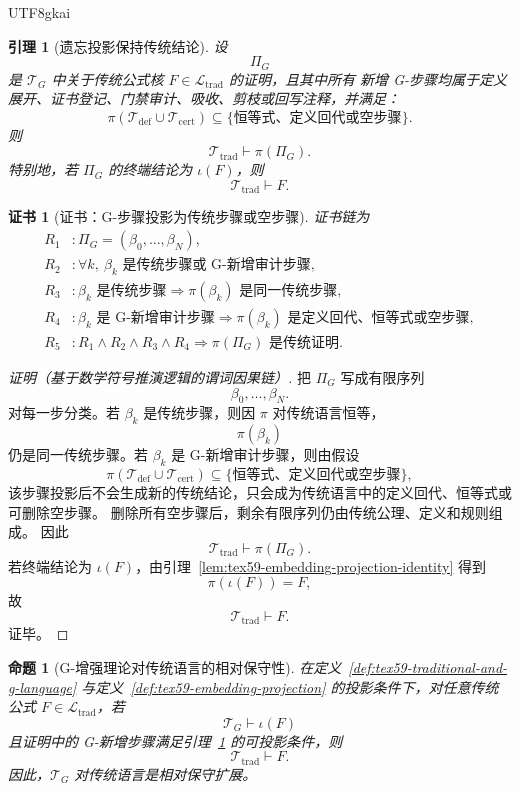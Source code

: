 \documentclass[12pt]{article}
\newtheorem{proposition}{命题}[section]
\newtheorem{lemma}{引理}[section]
\newtheorem{Certificate}{证书}[section]
\begin{document}
\begin{CJK*}{UTF8}{gkai}
\begin{lemma}[遗忘投影保持传统结论]
\label{lem:tex59-forgetful-projection-proof}
设
\[
  \Pi_G
\]
是 \(\mathcal T_G\) 中关于传统公式核 \(F\in\mathcal L_{\mathrm{trad}}\) 的证明，且其中所有
新增 G-步骤均属于定义展开、证书登记、门禁审计、吸收、剪枝或回写注释，并满足：
\[
  \pi(\mathcal T_{\mathrm{def}}\cup\mathcal T_{\mathrm{cert}})
  \subseteq
  \{\text{恒等式、定义回代或空步骤}\}.
\]
则
\[
  \mathcal T_{\mathrm{trad}}\vdash \pi(\Pi_G).
\]
特别地，若 \(\Pi_G\) 的终端结论为 \(\iota(F)\)，则
\[
  \mathcal T_{\mathrm{trad}}\vdash F.
\]
\end{lemma}

\begin{Certificate}[证书：G-步骤投影为传统步骤或空步骤]
\label{cert:tex59-forgetful-projection-proof}
证书链为
\[
\begin{aligned}
  R_1 &: \Pi_G=(\beta_0,\ldots,\beta_N),\\
  R_2 &: \forall k,\ \beta_k\text{ 是传统步骤或 G-新增审计步骤},\\
  R_3 &: \beta_k\text{ 是传统步骤}
         \Rightarrow
         \pi(\beta_k)\text{ 是同一传统步骤},\\
  R_4 &: \beta_k\text{ 是 G-新增审计步骤}
         \Rightarrow
         \pi(\beta_k)\text{ 是定义回代、恒等式或空步骤},\\
  R_5 &: R_1\wedge R_2\wedge R_3\wedge R_4
         \Rightarrow
         \pi(\Pi_G)\text{ 是传统证明}.
\end{aligned}
\]
\end{Certificate}

\begin{proof}[证明（基于数学符号推演逻辑的谓词因果链）]
把 \(\Pi_G\) 写成有限序列
\[
  \beta_0,\ldots,\beta_N.
\]
对每一步分类。若 \(\beta_k\) 是传统步骤，则因 \(\pi\) 对传统语言恒等，
\[
  \pi(\beta_k)
\]
仍是同一传统步骤。若 \(\beta_k\) 是 G-新增审计步骤，则由假设
\[
  \pi(\mathcal T_{\mathrm{def}}\cup\mathcal T_{\mathrm{cert}})
  \subseteq
  \{\text{恒等式、定义回代或空步骤}\},
\]
该步骤投影后不会生成新的传统结论，只会成为传统语言中的定义回代、恒等式或可删除空步骤。
删除所有空步骤后，剩余有限序列仍由传统公理、定义和规则组成。
因此
\[
  \mathcal T_{\mathrm{trad}}\vdash \pi(\Pi_G).
\]
若终端结论为 \(\iota(F)\)，由引理~\ref{lem:tex59-embedding-projection-identity}
得到
\[
  \pi(\iota(F))=F,
\]
故
\[
  \mathcal T_{\mathrm{trad}}\vdash F.
\]
证毕。
\end{proof}

\begin{proposition}[G-增强理论对传统语言的相对保守性]
\label{prop:tex59-relative-conservativity}
在定义~\ref{def:tex59-traditional-and-g-language} 与定义~\ref{def:tex59-embedding-projection}
的投影条件下，对任意传统公式 \(F\in\mathcal L_{\mathrm{trad}}\)，若
\[
  \mathcal T_G\vdash \iota(F)
\]
且证明中的 G-新增步骤满足引理~\ref{lem:tex59-forgetful-projection-proof} 的可投影条件，则
\[
  \mathcal T_{\mathrm{trad}}\vdash F.
\]
因此，\(\mathcal T_G\) 对传统语言是相对保守扩展。
\end{proposition}


\end{CJK*}
\end{document}
